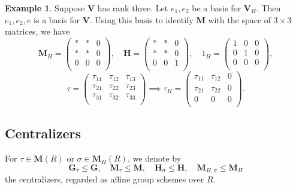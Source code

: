 \documentclass[reqno]{amsart}
\theoremstyle{plain} \newtheorem{theorem} {Theorem} \newtheorem{conjecture} {Conjecture} \newtheorem{corollary} [theorem] {Corollary} \newtheorem{proposition} [theorem] {Proposition} \newtheorem{fact} [theorem] {Fact}
\theoremstyle{definition} \newtheorem{definition} [theorem] {Definition}
\newtheorem{example} [theorem] {Example} \newtheorem{assertion}
\theoremstyle{itplain} %
\begin{document}
\begin{example}
  Suppose $\mathbf{V}$ has rank three.  Let $e_1, e_2$ be a basis for $\mathbf{V}_H$.  Then $e_1,e_2,e$ is a basis for $\mathbf{V}$.  Using this basis to identify $\mathbf{M}$ with the space of $3 \times 3$ matrices, we have
  \begin{equation*}
    \mathbf{M}_H =
    \begin{pmatrix}
      \ast & \ast & 0 \\
      \ast & \ast & 0 \\
      0 & 0 & 0 \\
    \end{pmatrix},
    \quad 
    \mathbf{H} =
    \begin{pmatrix}
      \ast & \ast & 0 \\
      \ast & \ast & 0 \\
      0 & 0 & 1 \\
    \end{pmatrix},
    \quad
    1_H =
    \begin{pmatrix}
      1 & 0 & 0 \\
      0 & 1 & 0 \\
      0 & 0 & 0 \\
    \end{pmatrix},
  \end{equation*}
  \begin{equation*}
    \tau =
    \begin{pmatrix}
      \tau _{11} & \tau _{12} & \tau _{13} \\
      \tau _{21} & \tau _{22} & \tau _{23} \\
      \tau _{31} & \tau _{32} & \tau _{33} \\
    \end{pmatrix}
    \implies
    \tau_H
    =
    \begin{pmatrix}
      \tau _{11} & \tau _{12} & 0 \\
      \tau _{21} & \tau _{22} & 0 \\
      0 & 0 & 0 \\
    \end{pmatrix}.
  \end{equation*}
\end{example}

\subsection{Centralizers}
For $\tau \in \mathbf{M}(R)$ or $\sigma \in \mathbf{M}_{H}(R)$, we denote by
\begin{equation*}
  \mathbf{G}_\tau \leq \mathbf{G}, \quad \mathbf{M}_{\tau} \leq \mathbf{M},
  \quad   \mathbf{H}_{\sigma} \leq \mathbf{H}, \quad \mathbf{M}_{H,\sigma} \leq \mathbf{M}_H
\end{equation*}
the centralizers, regarded as affine group schemes over $R$.
\end{document}
